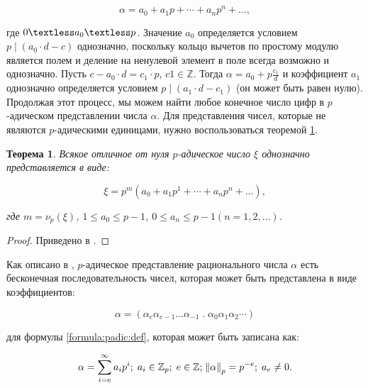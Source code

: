 \documentclass[master, och, diploma, times]{sty/SCWorks}
\theoremstyle{plain}
\newtheorem{thethm}{Теорема}[section]
\theoremstyle{definition}
\numberwithin{equation}{section}
\begin{document}
\begin{equation}\label{formula:padic:def}
\alpha=a_0+a_1p+\cdots+a_np^n+\dots,	
\end{equation}

\noindent где $0 \textless a_0 \textless p$. Значение $a_0$ определяется условием $p \mid (a_0 \cdot d-c)$ однозначно, поскольку кольцо вычетов по простому модулю является полем и деление на ненулевой элемент в поле всегда возможно и однозначно. Пусть $c-a_0 \cdot d=c_1 \cdot p$, $c1 \in \mathbb{Z}$. Тогда $\alpha=a_0+p\frac{c_1}{d}$ и коэффициент $a_1$ однозначно определяется условием $p \mid (a_1 \cdot d-c_1)$ (он может быть равен нулю). Продолжая этот процесс, мы можем найти любое конечное число цифр в $p$-адическом представлении числа $\alpha$. Для представления чисел, которые не являются $p$-адическими единицами, нужно воспользоваться теоремой \ref{th:numbers:representation}.

\begin{thethm}\label{th:numbers:representation}
Всякое отличное от нуля $p$-адическое число $\xi$ однозначно представляется в виде:

\begin{equation}
\xi=p^m(a_0+a_1p^1+\cdots+a_np^n+\dots),
\end{equation}

\noindent где $m=\nu_p(\xi)$, $1 \le a_0 \le p-1$, $0 \le a_n \le p-1$$(n=1,2,\dots)$.
\end{thethm}

\begin{proof}
Приведено в \cite{bib:number:borevich}.
\end{proof}


Как описано в \cite{bib:analysis:schikhof}, $p$-адическое представление рационального числа $\alpha$ есть бесконечная последовательность чисел, которая может быть представлена в виде коэффициентов:

\begin{equation}\label{formula:numbers:2}
\alpha=(\alpha_{e}\alpha_{e-1}\dots\alpha_{-1} \; . \; \alpha_0\alpha_1\alpha_2\cdots)
\end{equation}

\noindent для формулы \ref{formula:padic:def}, которая может быть записана как:

\begin{equation}
\alpha=\sum\limits_{i=e}^{\infty} a_ip^i; \; a_i \in \mathbb{Z}_p; \; e \in \mathbb{Z}; \; \norm{\alpha}_p=p^{-e}; \; a_e \neq 0.
\end{equation}
\end{document}
